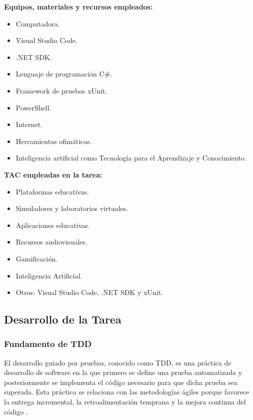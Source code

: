 \documentclass[12pt]{article}
\begin{document}
\textbf{Equipos, materiales y recursos empleados:}

\begin{itemize}
    \item Computadora.
    \item Visual Studio Code.
    \item .NET SDK.
    \item Lenguaje de programación C\#.
    \item Framework de pruebas xUnit.
    \item PowerShell.
    \item Internet.
    \item Herramientas ofimáticas.
    \item Inteligencia artificial como Tecnología para el Aprendizaje y Conocimiento.
\end{itemize}

\textbf{TAC empleadas en la tarea:}

\begin{itemize}
    \item[$\square$] Plataformas educativas.
    \item[$\square$] Simuladores y laboratorios virtuales.
    \item[$\boxtimes$] Aplicaciones educativas.
    \item[$\boxtimes$] Recursos audiovisuales.
    \item[$\square$] Gamificación.
    \item[$\boxtimes$] Inteligencia Artificial.
    \item Otros: Visual Studio Code, .NET SDK y xUnit.
\end{itemize}

\subsection{Desarrollo de la Tarea}

\subsubsection{Fundamento de TDD}

El desarrollo guiado por pruebas, conocido como TDD, es una práctica de desarrollo de software en la que primero se define una prueba automatizada y posteriormente se implementa el código necesario para que dicha prueba sea superada. Esta práctica se relaciona con las metodologías ágiles porque favorece la entrega incremental, la retroalimentación temprana y la mejora continua del código \cite{beck2003tdd,agilepracticeguide2017}.
\end{document}
